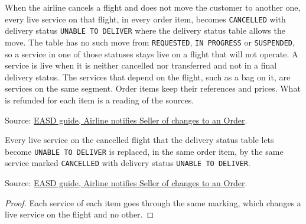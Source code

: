 \begin{definition}
  \label{def:airline-change-cancel-flight}
  When the airline cancels a flight and does not move the customer to
  another one, every live service on that flight, in every order item,
  becomes \texttt{CANCELLED} with delivery status \texttt{UNABLE TO
  DELIVER} where the delivery status table allows the move.  The table has
  no such move from \texttt{REQUESTED}, \texttt{IN PROGRESS} or
  \texttt{SUSPENDED}, so a service in one of those statuses stays live on a
  flight that will not operate.  A service is live when it is neither cancelled nor transferred
  and not in a final delivery status.  The services that depend on the
  flight, such as a bag on it, are services on the same segment.  Order
  items keep their references and prices.  What is refunded for each item
  is a reading of the sources.

  Source: \href{https://standards.atlassian.net/wiki/spaces/EASD/pages/815202352}{EASD guide, Airline notifies Seller of changes to an Order}.
\end{definition}

\begin{theorem}
  \label{thm:airline-change-flight-services-cancelled}
  Every live service on the cancelled flight that the delivery status table
  lets become \texttt{UNABLE TO DELIVER} is replaced, in the same order item,
  by the same service marked \texttt{CANCELLED} with delivery status
  \texttt{UNABLE TO DELIVER}.

  Source: \href{https://standards.atlassian.net/wiki/spaces/EASD/pages/815202352}{EASD guide, Airline notifies Seller of changes to an Order}.
\end{theorem}
\begin{proof}
  Each service of each item goes through the same marking, which changes a
  live service on the flight and no other.
\end{proof}

